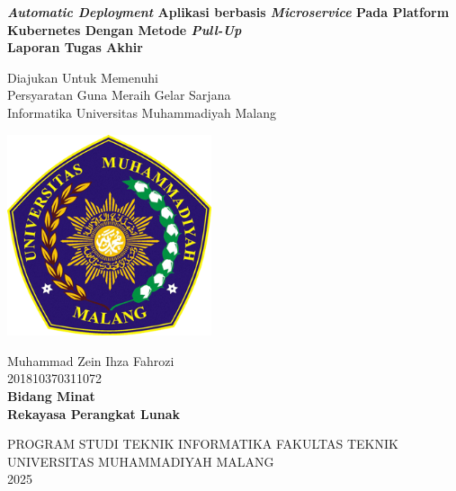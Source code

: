 \hidewatermark
\begin{titlepage}
    \begin{center}
        \onehalfspacing
        \large \bfseries \textit{Automatic Deployment}  Aplikasi berbasis \textit{Microservice} Pada Platform Kubernetes Dengan Metode \textit{Pull-Up} \\
        \vspace{1cm}
        \large Laporan Tugas Akhir \\
        \vspace{0.5cm}

        {\small \normalfont Diajukan Untuk Memenuhi\\
            Persyaratan Guna Meraih Gelar Sarjana\\
            Informatika Universitas Muhammadiyah Malang}
        \vspace{2cm}

        \includegraphics[width=6cm]{figures/logo_umm.png}

        \vspace{1cm}
        \normalfont \normalsize Muhammad Zein Ihza Fahrozi \\
        \normalfont \normalsize 201810370311072 \\

        \vspace{1cm}
        \bfseries \normalsize Bidang Minat \\
        \normalfont \normalsize Rekayasa Perangkat Lunak

        \vspace{2.5cm}

        \normalsize PROGRAM STUDI TEKNIK INFORMATIKA FAKULTAS TEKNIK \\
        UNIVERSITAS MUHAMMADIYAH MALANG \\
        2025



    \end{center}

\end{titlepage}

\newpage
\showwatermark
